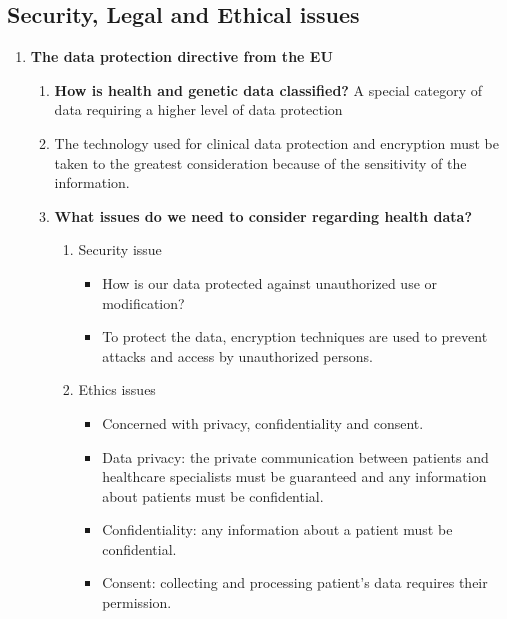 \documentclass[10pt, twoside]{article}   	%
\begin{document}
\subsection{Security, Legal and Ethical issues }
\begin{enumerate}
\item \textbf{The data protection directive from the EU}
    \begin{enumerate}
        \item \textbf{How is health and genetic data classified?} A special category of data requiring a higher level of data protection
        \item The technology used for clinical data protection and encryption must be taken to the greatest consideration because of the sensitivity of the information. 
        \item \textbf{What issues do we need to consider regarding health data?} 
            \begin{enumerate}    
                \item Security issue
                    \begin{itemize}
                        \item How is our data protected against unauthorized use or modification?
                        \item To protect the data, encryption techniques are used to prevent attacks and access by unauthorized persons.
                    \end{itemize}                                            
                \item Ethics issues 
                    \begin{itemize}
                        \item Concerned with privacy, confidentiality and consent. 
                        \item Data privacy: the private communication between patients and healthcare specialists must be guaranteed and any information about patients must be confidential.
                        \item Confidentiality: any information about a patient must be confidential.
                        \item Consent: collecting and processing patient's data requires their permission.                     

\end{itemize}
\end{enumerate}
\end{enumerate}
\end{enumerate}
\end{document}
